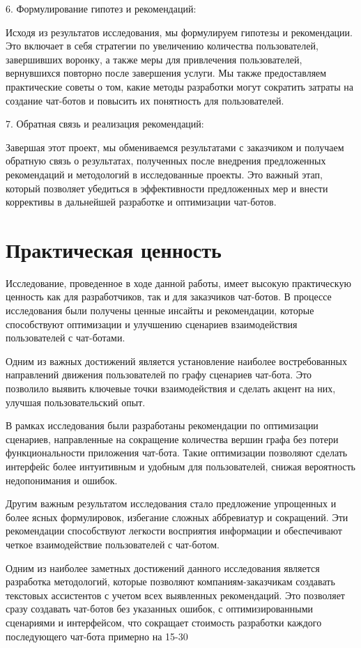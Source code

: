 \documentclass{article}
\begin{document}
6. Формулирование гипотез и рекомендаций:

Исходя из результатов исследования, мы формулируем гипотезы и рекомендации. Это включает в себя стратегии по увеличению количества пользователей, завершивших воронку, а также меры для привлечения пользователей, вернувшихся повторно после завершения услуги. Мы также предоставляем практические советы о том, какие методы разработки могут сократить затраты на создание чат-ботов и повысить их понятность для пользователей.

7. Обратная связь и реализация рекомендаций:

Завершая этот проект, мы обмениваемся результатами с заказчиком и получаем обратную связь о результатах, полученных после внедрения предложенных рекомендаций и методологий в исследованные проекты. Это важный этап, который позволяет убедиться в эффективности предложенных мер и внести коррективы в дальнейшей разработке и оптимизации чат-ботов.
\section{Практическая ценность}
Исследование, проведенное в ходе данной работы, имеет высокую практическую ценность как для разработчиков, так и для заказчиков чат-ботов. В процессе исследования были получены ценные инсайты и рекомендации, которые способствуют оптимизации и улучшению сценариев взаимодействия пользователей с чат-ботами.

Одним из важных достижений является установление наиболее востребованных направлений движения пользователей по графу сценариев чат-бота. Это позволило выявить ключевые точки взаимодействия и сделать акцент на них, улучшая пользовательский опыт.

В рамках исследования были разработаны рекомендации по оптимизации сценариев, направленные на сокращение количества вершин графа без потери функциональности приложения чат-бота. Такие оптимизации позволяют сделать интерфейс более интуитивным и удобным для пользователей, снижая вероятность недопонимания и ошибок.

Другим важным результатом исследования стало предложение упрощенных и более ясных формулировок, избегание сложных аббревиатур и сокращений. Эти рекомендации способствуют легкости восприятия информации и обеспечивают четкое взаимодействие пользователей с чат-ботом.

Одним из наиболее заметных достижений данного исследования является разработка методологий, которые позволяют компаниям-заказчикам создавать текстовых ассистентов с учетом всех выявленных рекомендаций. Это позволяет сразу создавать чат-ботов без указанных ошибок, с оптимизированными сценариями и интерфейсом, что сокращает стоимость разработки каждого последующего чат-бота примерно на 15-30%
\end{document}
